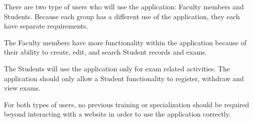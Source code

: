 
There are two type of users  who will use the application:
Faculty members and Students. Because each group has a different use of the
application, they each have separate requirements. 

The Faculty members have more functionality within the application because of
their ability to create, edit, and search Student records and exams.

The Students will use the application only for exam related activities. The
application should only allow a Student functionality to register,
withdraw and view exams.

For both types of users, no previous training  or specialization should be
required beyond interacting with a website in order to use the application
correctly.

